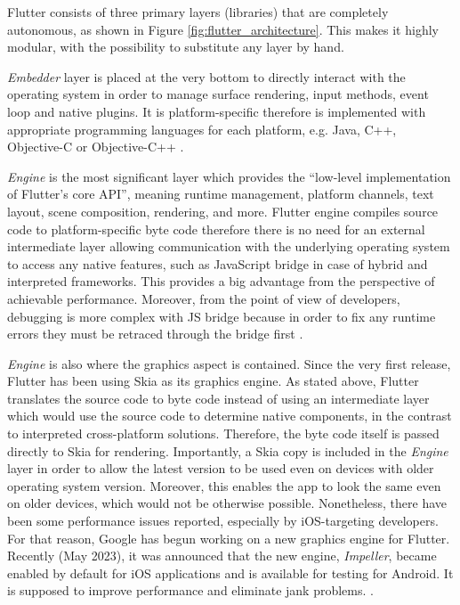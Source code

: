 Flutter consists of three primary layers (libraries) that are completely autonomous, as shown in Figure \ref{fig:flutter_architecture}. This makes it highly modular, with the possibility to substitute any layer by hand.

\emph{Embedder} layer is placed at the very bottom to directly interact with the operating system in order to manage surface rendering, input methods, event loop and native plugins. It is platform-specific therefore is implemented with appropriate programming languages for each platform, e.g. Java, C++, Objective-C or Objective-C++ \cite{flutter_docs_architecture}.

\emph{Engine} is the most significant layer which provides the ``low-level implementation of Flutter's core API'', meaning runtime management, platform channels, text layout, scene composition, rendering, and more. Flutter engine compiles source code to platform-specific byte code therefore there is no need for an external intermediate layer allowing communication with the underlying operating system to access any native features, such as JavaScript bridge in case of hybrid and interpreted frameworks. This provides a big advantage from the perspective of achievable performance. Moreover, from the point of view of developers, debugging is more complex with JS bridge because in order to fix any runtime errors they must be retraced through the bridge first \cite{flutter_docs_architecture,windmill_flutter_in_action}.

\emph{Engine} is also where the graphics aspect is contained. Since the very first release, Flutter has been using Skia as its graphics engine. As stated above, Flutter translates the source code to byte code instead of using an intermediate layer which would use the source code to determine native components, in the contrast to interpreted cross-platform solutions. Therefore, the byte code itself is passed directly to Skia for rendering. Importantly, a Skia copy is included in the \emph{Engine} layer in order to allow the latest version to be used even on devices with older operating system version. Moreover, this enables the app to look the same even on older devices, which would not be otherwise possible. Nonetheless, there have been some performance issues reported, especially by iOS-targeting developers. For that reason, Google has begun working on a new graphics engine for Flutter. Recently (May 2023), it was announced that the new engine, \emph{Impeller}, became enabled by default for iOS applications and is available for testing for Android. It is supposed to improve performance and eliminate jank problems.
\cite{flutter_docs_architecture,flutter_impeller,kosinski_flutter_vs_rn_vs_qt}.

